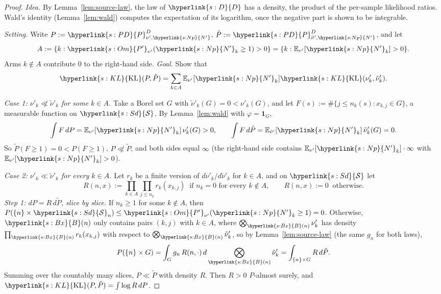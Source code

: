 \documentclass[11pt]{article}
\newcommand{\sy}[2]{\hyperlink{#1}{#2}}
\newcommand{\E}{\mathbb{E}}
\newcommand{\KL}{\sy{s:KL}{\mathrm{KL}}}
\newcommand{\ind}{\mathbf{1}}
\newcommand{\Sd}{\sy{s:Sd}{\mathcal{S}}}
\newcommand{\Bx}{\sy{s:Bx}{B}}
\newcommand{\Np}{\sy{s:Np}{N'}}
\newcommand{\Dd}{\sy{s:D}{D}}
\newcommand{\PD}{\sy{s:PD}{P}^{D}}
\newcommand{\Pp}{\sy{s:Om}{P'}}
\begin{document}
\begin{proof}
\emph{Idea.} By Lemma~\ref{lem:source-law}, the law of $\Dd$ has a density, the product of the
per-sample likelihood ratios. Wald's identity (Lemma~\ref{lem:wald}) computes the expectation of its
logarithm, once the negative part is shown to be integrable.

\emph{Setting.} Write $P:=\PD_{\nu',\Np}$, $\tilde P:=\PD_{\tilde\nu',\Np}$, and let
\begin{equation*}
A:=\{k:\Pp_{\nu'}(\Np_k\ge1)>0\}=\{k:\E_{\nu'}[\Np_k]>0\}.
\end{equation*}
Arms $k\notin A$ contribute $0$ to the right-hand side. \emph{Goal.} Show that
\begin{equation*}
\KL(P,\tilde P)=\sum_{k\in A}\E_{\nu'}[\Np_k]\KL(\nu'_k,\tilde\nu'_k).
\end{equation*}

\emph{Case 1: $\nu'_k\not\ll\tilde\nu'_k$ for some $k\in A$.} Take a Borel set $G$ with
$\tilde\nu'_k(G)=0<\nu'_k(G)$, and let $F(s):=\#\{j\le n_k(s):x_{k,j}\in G\}$, a measurable function
on $\Sd$. By Lemma~\ref{lem:wald} with $\varphi=\ind_G$,
\begin{equation*}
\int F\,dP=\E_{\nu'}[\Np_k]\,\nu'_k(G)>0,\qquad \int F\,d\tilde P=\E_{\tilde\nu'}[\Np_k]\,\tilde\nu'_k(G)=0.
\end{equation*}
So $\tilde P(F\ge1)=0<P(F\ge1)$, $P\not\ll\tilde P$, and both sides equal $\infty$ (the right-hand
side contains $\E_{\nu'}[\Np_k]\cdot\infty$ with $\E_{\nu'}[\Np_k]>0$).

\emph{Case 2: $\nu'_k\ll\tilde\nu'_k$ for every $k\in A$.} Let $r_k$ be a finite version of
$d\nu'_k/d\tilde\nu'_k$ for $k\in A$, and on $\Sd$ let
\begin{equation*}
R(n,x):=\prod_{k\in A}\prod_{j\le n_k}r_k(x_{k,j})\ \text{ if }n_k=0\text{ for every }k\notin A,
\qquad R(n,x):=0\ \text{ otherwise}.
\end{equation*}
\emph{Step 1: $dP=R\,d\tilde P$, slice by slice.} If $n_k\ge1$ for some $k\notin A$, then
$P(\{n\}\times\Sd_n)\le \Pp_{\nu'}(\Np_k\ge1)=0$. Otherwise, $\Bx(n)$ only contains pairs $(k,j)$ with
$k\in A$, where $\bigotimes_{\Bx(n)}\nu'_k$ has density $\prod_{\Bx(n)}r_k(x_{k,j})$ with respect to
$\bigotimes_{\Bx(n)}\tilde\nu'_k$, so by Lemma~\ref{lem:source-law} (the same $g_n$ for both laws),
\begin{equation*}
P(\{n\}\times G)=\int_Gg_n\,R(n,\cdot)\,d\bigotimes_{\Bx(n)}\tilde\nu'_k=\int_{\{n\}\times G}R\,d\tilde P.
\end{equation*}
Summing over the countably many slices, $P\ll\tilde P$ with density $R$. Then $R>0$ $P$-almost
surely, and $\KL(P,\tilde P)=\int\log R\,dP$.


\end{proof}
\end{document}
